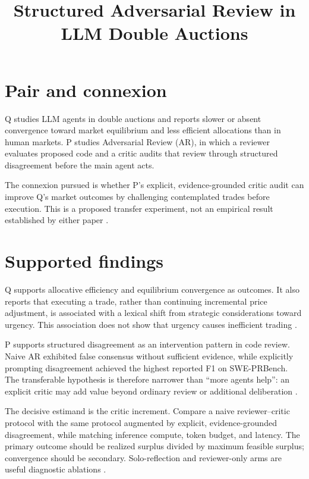 \documentclass{article}
\title{Structured Adversarial Review in LLM Double Auctions}
\begin{document}
\maketitle

\section{Pair and connexion}

Q studies LLM agents in double auctions and reports slower or absent convergence toward market equilibrium and less efficient allocations than in human markets. P studies Adversarial Review (AR), in which a reviewer evaluates proposed code and a critic audits that review through structured disagreement before the main agent acts.

The connexion pursued is whether P's explicit, evidence-grounded critic audit can improve Q's market outcomes by challenging contemplated trades before execution. This is a proposed transfer experiment, not an empirical result established by either paper .

\section{Supported findings}

Q supports allocative efficiency and equilibrium convergence as outcomes. It also reports that executing a trade, rather than continuing incremental price adjustment, is associated with a lexical shift from strategic considerations toward urgency. This association does not show that urgency causes inefficient trading .

P supports structured disagreement as an intervention pattern in code review. Naive AR exhibited false consensus without sufficient evidence, while explicitly prompting disagreement achieved the highest reported F1 on SWE-PRBench. The transferable hypothesis is therefore narrower than ``more agents help'': an explicit critic may add value beyond ordinary review or additional deliberation .

The decisive estimand is the critic increment. Compare a naive reviewer--critic protocol with the same protocol augmented by explicit, evidence-grounded disagreement, while matching inference compute, token budget, and latency. The primary outcome should be realized surplus divided by maximum feasible surplus; convergence should be secondary. Solo-reflection and reviewer-only arms are useful diagnostic ablations .
\end{document}
